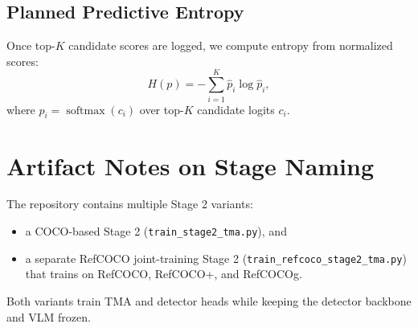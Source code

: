 \documentclass{uai2026} %
\begin{document}
\subsection{Planned Predictive Entropy}
Once top-\(K\) candidate scores are logged, we compute entropy from normalized scores:
\begin{equation}
H(p) = - \sum_{i=1}^{K} \hat{p}_i \log \hat{p}_i,
\end{equation}
where \(\hat{p}_i = \operatorname{softmax}(c_i)\) over top-\(K\) candidate logits \(c_i\).

\section{Artifact Notes on Stage Naming}\label{app:stages}
The repository contains multiple Stage 2 variants:
\begin{itemize}
\item a COCO-based Stage 2 (\texttt{train\_stage2\_tma.py}), and
\item a separate RefCOCO joint-training Stage 2 (\texttt{train\_refcoco\_stage2\_tma.py}) that trains on RefCOCO, RefCOCO+, and RefCOCOg.
\end{itemize}
Both variants train TMA and detector heads while keeping the detector backbone and VLM frozen.
\end{document}
